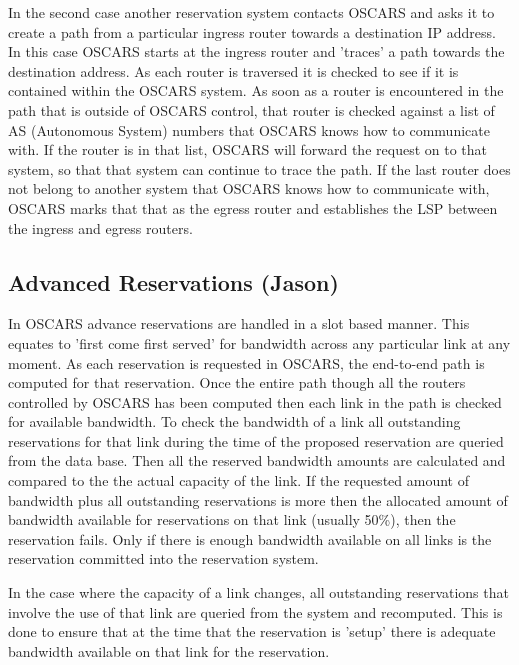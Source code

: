 \documentclass[conference]{IEEEtran}
\begin{document}
In the second case another reservation system contacts OSCARS and asks it to
create a path from a particular ingress router towards a destination IP address.
In this case OSCARS starts at the ingress router and 'traces' a path towards the
destination address. As each router is traversed it is checked to see if it is
contained within the OSCARS system. As soon as a router is encountered in the
path that is outside of OSCARS control, that router is checked against a list of
AS (Autonomous System) numbers that OSCARS knows how to communicate with. If the
router is in that list, OSCARS will forward the request on to that system, so
that that system can continue to trace the path. If the last router does not
belong to another system that OSCARS knows how to communicate with, OSCARS marks
that that as the egress router and establishes the LSP between the ingress and
egress routers.

\subsection{Advanced Reservations (Jason)}
In OSCARS advance reservations are handled in a slot based manner. This equates
to 'first come first served' for bandwidth across any particular link at any
moment. As each reservation is requested in OSCARS, the end-to-end path is
computed for that reservation. Once the entire path though all the routers
controlled by OSCARS has been computed then each link in the path is checked for
available bandwidth. To check the bandwidth of a link all outstanding
reservations for that link during the time of the proposed reservation are
queried from the data base. Then all the reserved bandwidth amounts are
calculated and compared to the the actual capacity of the link. If the requested
amount of bandwidth plus all outstanding reservations is more then the allocated
amount of bandwidth available for reservations on that link (usually
50\%), then the reservation fails. Only if there is enough bandwidth 
available on all links is the reservation committed into the reservation system.

In the case where the capacity of a link changes, all outstanding reservations
that involve the use of that link are queried from the system and recomputed.
This is done to ensure that at the time that the reservation is 'setup' there
is adequate bandwidth available on that link for the reservation.
\end{document}
